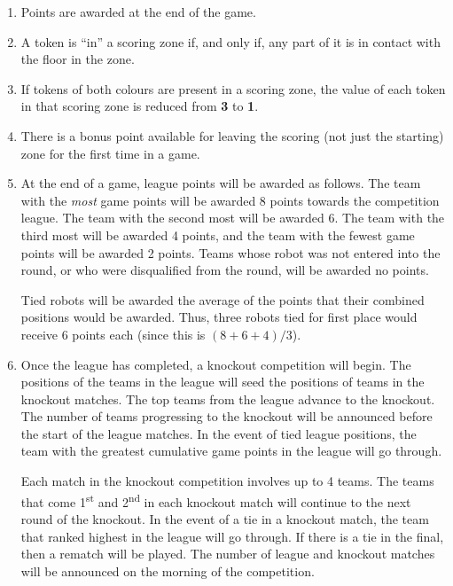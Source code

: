 \begin{enumerate}
\item Points are awarded at the end of the game.

\item A token is ``in'' a scoring zone if, and only if, any part of it is in contact with the floor in the zone.

\item If tokens of both colours are present in a scoring zone, the value of each token in that scoring zone is reduced from \textbf{3} to \textbf{1}.

\item There is a bonus point available for leaving the scoring (not just the starting) zone for the first time in a game.

\item At the end of a game, league points will be awarded as follows.
      The team with the \emph{most} game points will be awarded 8 points towards the competition league.
      The team with the second most will be awarded 6.
      The team with the third most will be awarded 4 points, and the team with the fewest game points will be awarded 2 points.
      Teams whose robot was not entered into the round, or who were disqualified from the round, will be awarded no points.

      Tied robots will be awarded the average of the points that their combined positions would be awarded.
      Thus, three robots tied for first place would receive 6 points each (since this is $(8+6+4)/3$).

\item Once the league has completed, a knockout competition will begin.
      The positions of the teams in the league will seed the positions of teams in the knockout matches.
      The top teams from the league advance to the knockout.
      The number of teams progressing to the knockout will be announced before the start of the league matches.
      In the event of tied league positions, the team with the greatest cumulative game points in the league will go through.

      Each match in the knockout competition involves up to 4 teams.
      The teams that come 1\textsuperscript{st} and 2\textsuperscript{nd} in each knockout match will continue to the next round of the knockout.
      In the event of a tie in a knockout match, the team that ranked highest in the league will go through.
      If there is a tie in the final, then a rematch will be played.
      The number of league and knockout matches will be announced on the morning of the competition.

\end{enumerate}
